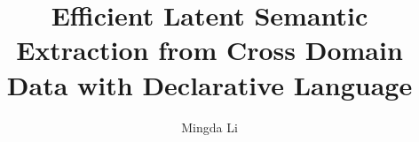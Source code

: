 \documentclass [PhD] {uclathes}
\title{Efficient Latent Semantic Extraction from Cross Domain Data with Declarative Language}
\author         {Mingda Li}
\begin{document}
\makeintropages




\end{document}
